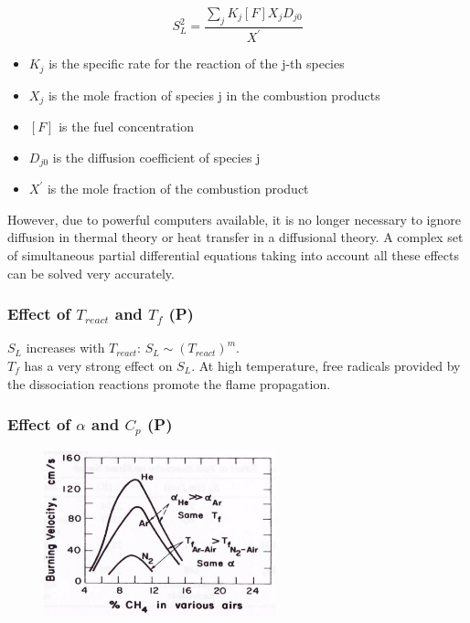 \documentclass[12pt]{article}
\begin{document}
\begin{equation}
    S_{L}^{2} =\frac{\sum_{j}K_{j}[F]X_{j}D_{j0}}{X^{'}}
\end{equation}
\begin{itemize}
    \item $K_{j}$ is the specific rate for the reaction of the j-th species
    \item $X_{j}$ is the mole fraction of species j in the combustion products
    \item $[F]$ is the fuel concentration
    \item $D_{j0}$ is the diffusion coefficient of species j
    \item $X^{'}$ is the mole fraction of the combustion product
\end{itemize}

However, due to powerful computers available, it is no longer necessary to ignore diffusion in thermal theory or heat transfer in a diffusional theory. A complex set of simultaneous partial differential equations taking into account all these effects can be solved very accurately.

\subsubsection{Effect of $T_{react}$ and $T_{f}$ (P)}

$S_{L}$ increases with $T_{react}$: $S_{L}\sim (T_{react})^{m}$.\\
$T_{f}$ has a very strong effect on $S_{L}$. At high temperature, free radicals provided by the dissociation reactions promote the flame propagation.

\subsubsection{Effect of $\alpha$ and $C_{p}$ (P)}

\begin{figure}[!ht]
\centering
\includegraphics[width=0.6\textwidth]{figures/speed.png}
\end{figure}
\end{document}

